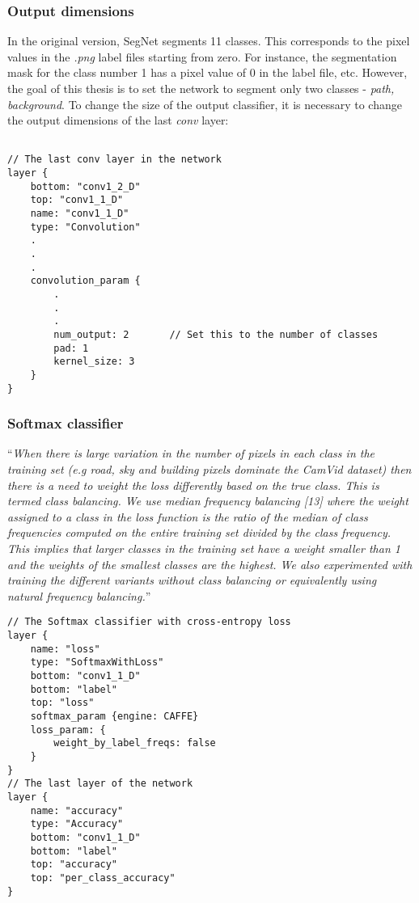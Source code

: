 \subsubsection{Output dimensions}

In the original version, SegNet segments 11 classes. This corresponds to the pixel values in the \textit{.png} label files starting from zero. For instance, the segmentation mask for the class number 1 has a pixel value of 0 in the label file, etc. However, the goal of this thesis is to set the network to segment only two classes - \textit{path, background}. To change the size of the output classifier, it is necessary to change the output dimensions of the last \textit{conv} layer:

\begin{lstlisting}[caption={Setting number of outputs in \textit{train.prototxt} \cite{filip_github}},captionpos=b]

// The last conv layer in the network
layer {
	bottom: "conv1_2_D"
	top: "conv1_1_D"
	name: "conv1_1_D"
	type: "Convolution"
	.
	.
	.
	convolution_param {
		.
		.
		.
		num_output: 2		// Set this to the number of classes
		pad: 1
		kernel_size: 3
	}
}
\end{lstlisting}

\newpage
\subsubsection{Softmax classifier}

\enquote{\textit{When there is large variation in the number of
	pixels in each class in the training set (e.g road, sky and building
	pixels dominate the CamVid dataset) then there is a need to weight
	the loss differently based on the true class. This is termed class
	balancing. We use median frequency balancing [13] where the
	weight assigned to a class in the loss function is the ratio of the
	median of class frequencies computed on the entire training set
	divided by the class frequency. This implies that larger classes in
	the training set have a weight smaller than 1 and the weights
	of the smallest classes are the highest. We also experimented
	with training the different variants without class balancing or
	equivalently using natural frequency balancing.}} \cite{segnet}

\begin{lstlisting}[caption={Output layers of \textit{train.prototxt} \cite{filip_github}},captionpos=b]
// The Softmax classifier with cross-entropy loss
layer {
	name: "loss"
	type: "SoftmaxWithLoss"
	bottom: "conv1_1_D"
	bottom: "label"
	top: "loss"
	softmax_param {engine: CAFFE}
	loss_param: {
		weight_by_label_freqs: false	     
	}
}
// The last layer of the network
layer {
	name: "accuracy"
	type: "Accuracy"
	bottom: "conv1_1_D"
	bottom: "label"
	top: "accuracy"
	top: "per_class_accuracy"
}
\end{lstlisting}

